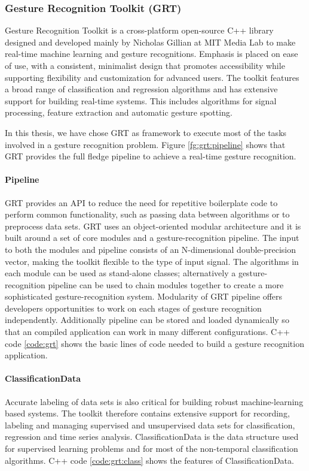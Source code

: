 \subsubsection{Gesture Recognition Toolkit (GRT)} \label{sec:grt} Gesture Recognition Toolkit is a cross-platform open-source C++ library designed and developed mainly by Nicholas Gillian at MIT Media Lab to make real-time machine learning and gesture recognitions. Emphasis is placed on ease of use, with a consistent, minimalist design that promotes accessibility while supporting flexibility and customization for advanced users. The toolkit features a broad range of classification and regression algorithms and has extensive support for building real-time systems. This includes algorithms for signal processing, feature extraction and automatic gesture spotting. 

In this thesis, we have chose GRT as framework to execute most of the tasks involved in a gesture recognition problem. Figure \ref{fg:grt:pipeline} shows that GRT provides the full fledge pipeline to achieve a real-time gesture recognition. 



\paragraph*{Pipeline} GRT provides an API to reduce the need for repetitive boilerplate code to perform common functionality, such as passing data between algorithms or to preprocess data sets. GRT uses an object-oriented modular architecture and it is built around a set of core modules and a gesture-recognition pipeline. The input to both the modules and pipeline consists of an N-dimensional double-precision vector, making the toolkit flexible to the type of input signal. The algorithms in each module can be used as stand-alone classes; alternatively a gesture-recognition pipeline can be used to chain modules together to create a more sophisticated gesture-recognition system. Modularity of GRT pipeline offers developers opportunities to work on each stages of gesture recognition independently. Additionally pipeline can be stored and loaded dynamically so that an compiled application can work in many different configurations. C++ code \ref{code:grt} shows the basic lines of code needed to build a gesture recognition application.

 \label{code:grt}

\paragraph*{ClassificationData} Accurate labeling of data sets is also critical for building robust machine-learning based systems. The toolkit therefore contains extensive support for recording, labeling and managing supervised and unsupervised data sets for classification, regression and time series analysis. ClassificationData is the data structure used for supervised learning problems and for most of the non-temporal classification algorithms. C++ code \ref{code:grt:class} shows the features of ClassificationData.


